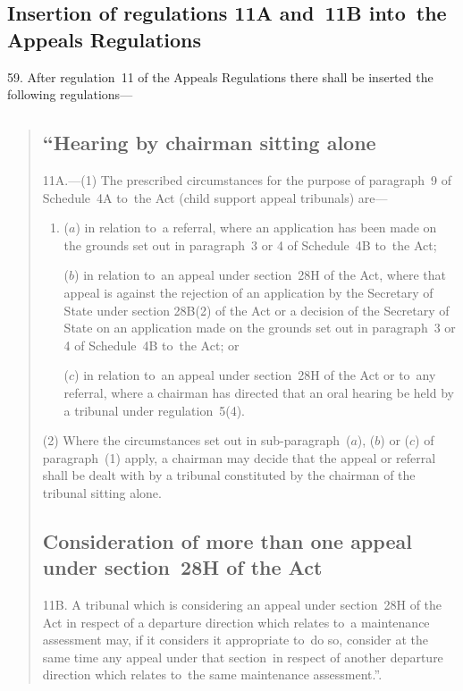 \documentclass[12pt,a4paper]{article}
\begin{document}
\subsection[59. Insertion of regulations 11A and~11B into~the Appeals Regulations]{Insertion of regulations 11A and~11B into~the Appeals Regulations}

59. After
regulation~11 of the Appeals Regulations there shall be inserted the following
regulations—
\begin{quotation}
\subsection*{“Hearing by chairman sitting alone}

11A.—(1) The prescribed circumstances for the
purpose of paragraph~9 of Schedule~4A to~the Act (child support appeal
tribunals) are—
\begin{enumerate}\item[]
($a$) in relation to~a referral, where an application has been made on the grounds
set out in paragraph~3 or 4 of Schedule~4B to~the Act;

($b$) in relation to~an appeal under section~28H of the Act, where that appeal is
against the rejection of an application by the Secretary of State under section
28B(2) of the Act or a decision of the Secretary of State on an application made
on the grounds set out in paragraph~3 or 4 of Schedule~4B to~the Act; or

($c$) in relation to~an appeal under section~28H of the Act or to~any referral,
where a chairman has directed that an oral hearing be held by a tribunal under
regulation~5(4).
\end{enumerate}

(2) Where the circumstances set out in sub-paragraph~($a$), ($b$) or ($c$) of
paragraph~(1) apply, a chairman may decide that the appeal or referral shall be
dealt with by a tribunal constituted by the chairman of the tribunal sitting
alone.

\subsection*{Consideration of more than one appeal under section~28H of the Act}

11B. A
tribunal which is considering an appeal under section~28H of the Act in respect
of a departure direction which relates to~a maintenance assessment may, if it
considers it appropriate to~do so, consider at the same time any appeal under
that section~in respect of another departure direction which relates to~the same
maintenance assessment.”.
\end{quotation}
\end{document}
